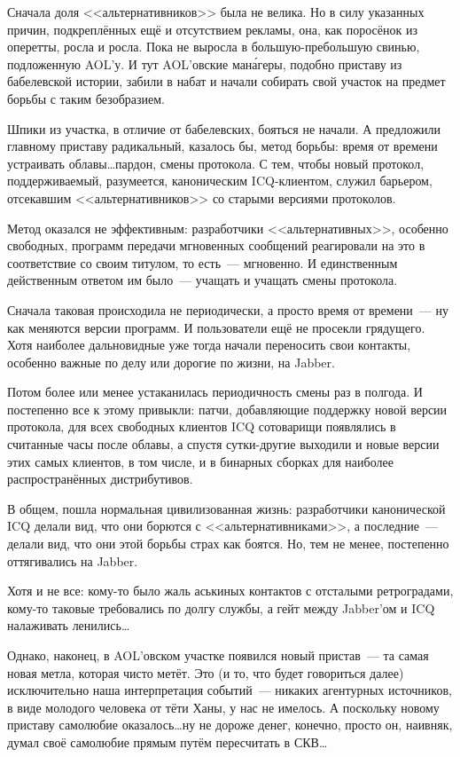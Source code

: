 Сначала доля <<альтернативников>> была не велика. Но в силу указанных причин, подкреплённых ещё и отсутствием рекламы, она, как поросёнок из оперетты, росла и росла. Пока не выросла в большую-пребольшую свинью, подложенную AOL'у. И тут AOL'овские 
ман\'{а}геры, подобно приставу из бабелевской истории, забили в набат и начали собирать свой участок на предмет борьбы с таким безобразием. 

Шпики из участка, в отличие от бабелевских, бояться не начали. А предложили главному приставу радикальный, казалось бы, метод борьбы: время от времени устраивать облавы\dots пардон, смены протокола. С тем, чтобы новый протокол, поддерживаемый, разумеется, каноническим ICQ-клиентом, служил барьером, отсекавшим <<альтернативников>> со старыми версиями протоколов. 

Метод оказался не эффективным: разработчики <<альтернативных>>, особенно свободных, программ передачи мгновенных сообщений реагировали на это в соответствие со своим титулом, то есть~--- мгновенно. И единственным действенным ответом им было~--- учащать и учащать смены протокола. 

Сначала таковая происходила не периодически, а просто время от времени~--- ну как меняются версии программ. И пользователи ещё не просекли грядущего. Хотя наиболее дальновидные уже тогда начали переносить свои контакты, особенно важные по делу или дорогие по жизни, на Jabber. 

Потом более или менее устаканилась периодичность смены раз в полгода. И постепенно все к этому привыкли: патчи, добавляющие поддержку новой версии протокола, для всех свободных клиентов ICQ сотоварищи появлялись в считанные часы после облавы, а спустя сутки-другие выходили и новые версии этих самых клиентов, в том числе, и в бинарных сборках для наиболее распространённых дистрибутивов. 

В общем, пошла нормальная цивилизованная жизнь: разработчики канонической ICQ делали вид, что они борются с <<альтернативниками>>, а последние~--- делали вид, что они этой борьбы страх как боятся. Но, тем не менее, постепенно оттягивались на Jabber. 

Хотя и не все: кому-то было жаль аськиных контактов с отсталыми ретроградами, кому-то таковые требовались по долгу службы, а гейт между Jabber'ом и ICQ налаживать ленились\dots 

Однако, наконец, в AOL'овском участке появился новый пристав~--- та самая новая метла, которая чисто метёт. Это (и то, что будет говориться далее) исключительно наша интерпретация событий~--- никаких агентурных источников, в виде молодого человека от тёти Ханы, у нас не имелось. А поскольку новому приставу самолюбие оказалось\dots ну не дороже денег, конечно, просто он, наивняк, думал своё самолюбие прямым путём пересчитать в СКВ\dots 

